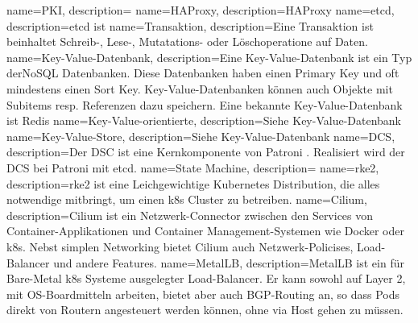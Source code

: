 {
        name=PKI,
        description={}
}
{
        name=HAProxy,
        description={HAProxy \cite{U6F2DWTQ}}
}
{
        name=etcd,
        description={etcd ist \cite{8A4R4E2D}}
}
{
        name=Transaktion,
        description={Eine Transaktion ist beinhaltet Schreib-, Lese-, Mutatations- oder Löschoperatione auf Daten.}
}
{
        name=Key-Value-Datenbank,
        description={Eine Key-Value-Datenbank ist ein Typ der\Gls{NoSQL} Datenbanken.
        Diese Datenbanken haben einen Primary Key und oft mindestens einen Sort Key.
        Key-Value-Datenbanken können auch Objekte mit Subitems resp. Referenzen dazu speichern.
        Eine bekannte Key-Value-Datenbank ist \Gls{Redis}}
}
{
        name=Key-Value-orientierte,
        description={Siehe \Gls{Key-Value-Datenbank}}
}
{
        name=Key-Value-Store,
        description={Siehe \Gls{Key-Value-Datenbank}}
}
{
        name=DCS,
        description={Der DSC ist eine Kernkomponente von Patroni \cite{LVMUNS8P}.
        Realisiert wird der DCS bei Patroni mit \Gls{etcd}.}
}
{
        name=State Machine,
        description={}
}
{
        name=rke2,
        description={rke2 ist eine Leichgewichtige Kubernetes Distribution, die alles notwendige mitbringt, um einen k8s Cluster zu betreiben\cite{F59M6UU2}.}
}
{
        name=Cilium,
        description={Cilium ist ein Netzwerk-Connector zwischen den Services von Container-Applikationen und Container Management-Systemen wie Docker oder k8s.
        Nebst simplen Networking bietet Cilium auch Netzwerk-Policises, Load-Balancer und andere Features\cite{YH7CFGP5,647E9FLZ}.}
}
{
        name=MetalLB,
        description={MetalLB ist ein für Bare-Metal k8s Systeme ausgelegter Load-Balancer.
        Er kann sowohl auf Layer 2, mit OS-Boardmitteln arbeiten, bietet aber auch BGP-Routing an,
        so dass Pods direkt von Routern angesteuert werden können, ohne via Host gehen zu müssen\cite{2B7NV2LT}.}
}